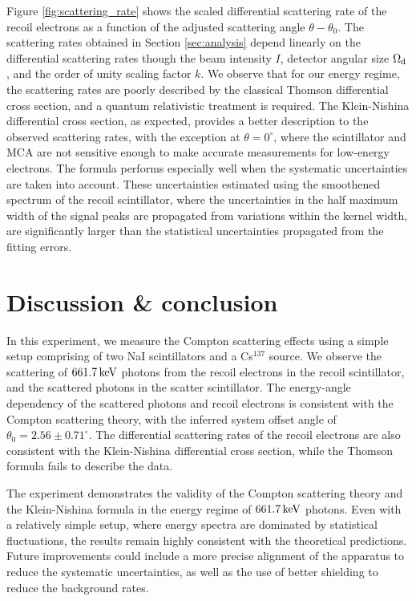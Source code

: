 \documentclass[aps,twocolumn,secnumarabic,balancelastpage,amsmath,amssymb,nofootinbib,floatfix]{revtex4-1}
\newcommand{\keV}{\,{\rm keV}}
\begin{document}
Figure \ref{fig:scattering_rate} shows the scaled differential scattering rate of the recoil electrons as a function of the adjusted scattering angle $\theta - \theta_0$. The scattering rates obtained in Section \ref{sec:analysis} depend linearly on the differential scattering rates though the beam intensity $I$, detector angular size $\Omega_{\rm{d}}$, and the order of unity scaling factor $k$. We observe that for our energy regime, the scattering rates are poorly described by the classical Thomson differential cross section, and a quantum relativistic treatment is required. The Klein-Nishina differential cross section, as expected, provides a better description to the observed scattering rates, with the exception at $\theta = 0^\circ$, where the scintillator and MCA are not sensitive enough to make accurate measurements for low-energy electrons. The formula performs especially well when the systematic uncertainties are taken into account. These uncertainties estimated using the smoothened spectrum of the recoil scintillator, where the uncertainties in the half maximum width of the signal peaks are propagated from variations within the kernel width, are significantly larger than the statistical uncertainties propagated from the fitting errors.


\section{Discussion \& conclusion}
\label{sec:conclusion}

In this experiment, we measure the Compton scattering effects using a simple setup comprising of two NaI scintillators and a Cs$^{137}$ source. We observe the scattering of $661.7\keV$ photons from the recoil electrons in the recoil scintillator, and the scattered photons in the scatter scintillator. The energy-angle dependency of the scattered photons and recoil electrons is consistent with the Compton scattering theory, with the inferred system offset angle of $\theta_0 = 2.56 \pm 0.71^\circ$. The differential scattering rates of the recoil electrons are also consistent with the Klein-Nishina differential cross section, while the Thomson formula fails to describe the data.

The experiment demonstrates the validity of the Compton scattering theory and the Klein-Nishina formula in the energy regime of $661.7\keV$ photons. Even with a relatively simple setup, where energy spectra are dominated by statistical fluctuations, the results remain highly consistent with the theoretical predictions. Future improvements could include a more precise alignment of the apparatus to reduce the systematic uncertainties, as well as the use of better shielding to reduce the background rates.
\end{document}
